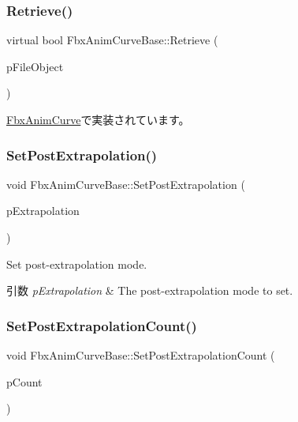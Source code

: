 \subsubsection{\texorpdfstring{Retrieve()}{Retrieve()}}
{\footnotesize\ttfamily virtual bool Fbx\+Anim\+Curve\+Base\+::\+Retrieve (\begin{DoxyParamCaption}\item[{\hyperlink{class_fbx_i_o}{Fbx\+IO} $\ast$}]{p\+File\+Object }\end{DoxyParamCaption})\hspace{0.3cm}{\ttfamily [pure virtual]}}



\hyperlink{class_fbx_anim_curve_a17087752d3a28d373b2aaa66d1755f62}{Fbx\+Anim\+Curve}で実装されています。

\mbox{\label{class_fbx_anim_curve_base_a80e57bd8e710d36348eeb326fd83951b}} 
\subsubsection{\texorpdfstring{Set\+Post\+Extrapolation()}{SetPostExtrapolation()}}
{\footnotesize\ttfamily void Fbx\+Anim\+Curve\+Base\+::\+Set\+Post\+Extrapolation (\begin{DoxyParamCaption}\item[{\hyperlink{class_fbx_anim_curve_base_aa7214d43daa7b6b9b47a8118a858847f}{E\+Extrapolation\+Type}}]{p\+Extrapolation }\end{DoxyParamCaption})}

Set post-\/extrapolation mode. 
\begin{DoxyParams}{引数}
{\em p\+Extrapolation} & The post-\/extrapolation mode to set. \\
\hline
\end{DoxyParams}
\mbox{\label{class_fbx_anim_curve_base_a4201935f2bc54e924658cc0dd4e7bf74}} 
\subsubsection{\texorpdfstring{Set\+Post\+Extrapolation\+Count()}{SetPostExtrapolationCount()}}
{\footnotesize\ttfamily void Fbx\+Anim\+Curve\+Base\+::\+Set\+Post\+Extrapolation\+Count (\begin{DoxyParamCaption}\item[{unsigned long}]{p\+Count }\end{DoxyParamCaption})}

